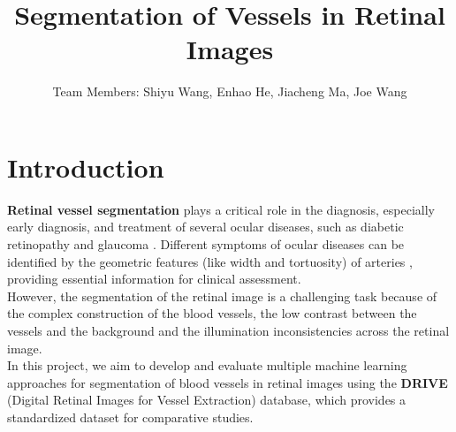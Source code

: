 \documentclass[12pt,letterpaper]{article}
\begin{document}
\title{\textbf{Segmentation of Vessels in Retinal Images}}
\author{Team Members: Shiyu Wang, Enhao He, Jiacheng Ma, Joe Wang}
\date{}
\setlength{\droptitle}{-2.75cm}
\maketitle
\vspace{-2cm}


\section{Introduction}
\textbf{Retinal vessel segmentation} plays a critical role in the diagnosis, especially early diagnosis, and treatment of several ocular diseases, such as diabetic retinopathy and glaucoma \cite{1}. Different symptoms of ocular diseases can be identified by the geometric features (like width and tortuosity) of arteries \cite{review2022}, providing essential information for clinical assessment. \\
However, the segmentation of the retinal image is a challenging task because of the complex construction of the blood vessels, the low contrast between the vessels and the background and the illumination inconsistencies across the retinal image. \\ 
In this project, we aim to develop and evaluate multiple machine learning approaches for segmentation of blood vessels in retinal images using the \textbf{DRIVE} (Digital Retinal Images for Vessel Extraction) database, which provides a standardized dataset for comparative studies.
\end{document}
